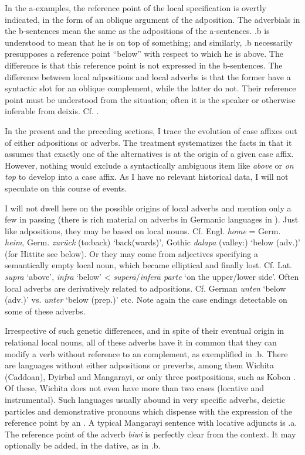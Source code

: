 \noindent In the a-examples, the reference point of the local specification is overtly indicated, in the form of an oblique argument of the adposition. The adverbials in the b-sentences mean the same as the adpositions of the a-sentences. .b is understood to mean that he is on top of something; and similarly, .b necessarily presupposes a reference point “below” with respect to which he is above. The difference is that this reference point is not expressed in the b-sentences. The difference between local adpositions and local adverbs is that the former have a syntactic slot for an oblique complement, while the latter do not. Their reference point must be understood from the situation; often it is the speaker or otherwise inferable from deixis. Cf. \citet[150f]{Matthews1981}.

In the present and the preceding sections, I trace the evolution of case affixes out of either adpositions or adverbs. The treatment systematizes the facts in that it assumes that exactly one of the alternatives is at the origin of a given case affix. However, nothing would exclude a syntactically ambiguous item like \textit{above} or \textit{on top} to develop into a case affix. As I have no relevant historical data, I will not speculate on this course of events.

I will not dwell here on the possible origins of local adverbs and mention only a few in passing (there is rich material on adverbs in Germanic languages in \citealt[173--175]{Ramat1980}). Just like adpositions, they may be based on local nouns. Cf. Engl. \textit{home} = Germ. \textit{heim}, Germ. \textit{zurück} (to:back) ‘back(wards)’, Gothic \textit{dalapa} (valley:\glloc) ‘below (adv.)’ (for Hittite see below). Or they may come from adjectives specifying a semantically empty local noun, which became elliptical and finally lost. Cf. Lat. \textit{supra} ‘above’, \textit{infra} ‘below’ {\textless} \textit{super\=a}/\textit{infer\=a parte} ‘on the upper/lower side’. Often local adverbs are derivatively related to adpositions. Cf. German \textit{unten} ‘below (adv.)’ vs. \textit{unter} ‘below (prep.)’ etc. Note again the case endings detectable on some of these adverbs.

Irrespective of such genetic differences, and in spite of their eventual origin in relational local nouns, all of these adverbs have it in common that they can modify a verb without reference to an \np complement, as exemplified in .b. There are languages without either adpositions or preverbs, among them Wichita (Caddoan), Dyirbal and Mangarayi, or only three postpositions, such as Kobon \citep[205f]{Davies1981}. Of these, Wichita does not even have more than two cases (locative and instrumental). Such languages usually abound in very specific adverbs, deictic particles and demonstrative pronouns which dispense with the expression of the reference point by an \np. A typical Mangarayi sentence with locative adjuncts is .a. The reference point of the adverb \textit{biwi} is perfectly clear from the context. It may optionally be added, in the dative, as in .b.

